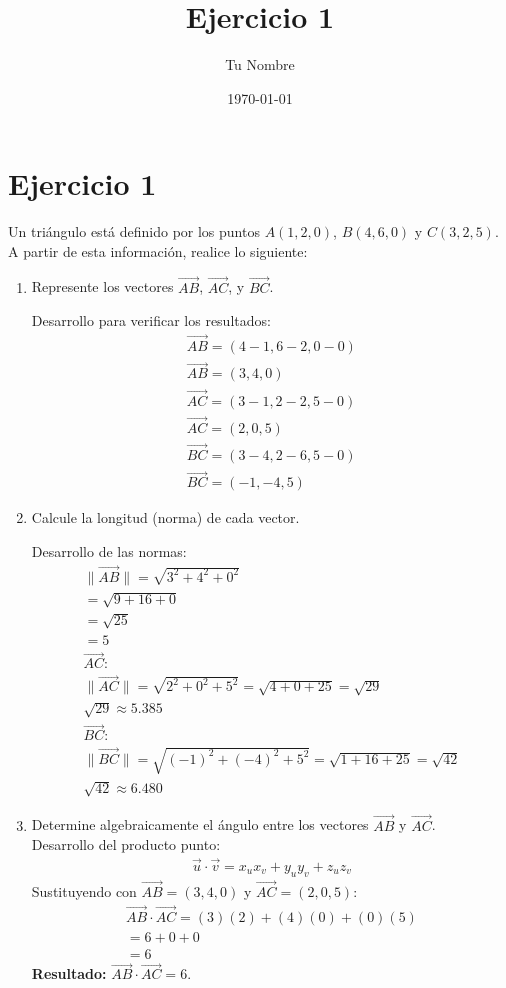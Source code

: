 \documentclass{article}
\title{Ejercicio 1}
\author{Tu Nombre}
\date{\today}
\begin{document}
\maketitle

\section*{Ejercicio 1}
Un triángulo está definido por los puntos $A(1,2,0)$, $B(4,6,0)$ y $C(3,2,5)$. A partir de esta información, realice lo siguiente:

\begin{enumerate}
    \item Represente los vectores $\overrightarrow{AB}$, $\overrightarrow{AC}$, y $\overrightarrow{BC}$.

    Desarrollo para verificar los resultados:
    \begin{gather*}
        \overrightarrow{AB}= (4-1,  6-2, 0-0) \\
        \overrightarrow{AB}=(3, 4, 0) \\
        \overrightarrow{AC}= (3-1,  2-2,  5-0) \\
        \overrightarrow{AC}=(2, 0,5) \\
        \overrightarrow{BC}= (3-4,2-6,5-0) \\
        \overrightarrow{BC}=(-1, -4,5)
    \end{gather*}
    \item Calcule la longitud (norma) de cada vector.

    Desarrollo de las normas:
    \begin{gather*}
        \|\vec{AB}\| = \sqrt{3^2 + 4^2 + 0^2} \\
        = \sqrt{9 + 16 + 0} \\
        = \sqrt{25} \\
        = 5 \\
        \vec{AC}: \\
        \|\vec{AC}\| = \sqrt{2^2 + 0^2 + 5^2} = \sqrt{4 + 0 + 25} = \sqrt{29} \\
        \sqrt{29} \approx 5.385 \\
        \vec{BC}: \\
        \|\vec{BC}\| = \sqrt{(-1)^2 + (-4)^2 + 5^2} = \sqrt{1 + 16 + 25} = \sqrt{42} \\
        \sqrt{42} \approx 6.480
    \end{gather*}
    \item Determine algebraicamente el ángulo entre los vectores $\overrightarrow{AB}$ y $\overrightarrow{AC}$.\\
    Desarrollo del producto punto:
    \begin{gather*}
        \vec{u}\cdot\vec{v} = x_u x_v + y_u y_v + z_u z_v
    \end{gather*}
    Sustituyendo con $\vec{AB}=(3,4,0)$ y $\vec{AC}=(2,0,5)$:
    \begin{gather*}
        \vec{AB}\cdot\vec{AC} = (3)(2) + (4)(0) + (0)(5) \\
        = 6 + 0 + 0 \\
        = 6
    \end{gather*}
    \noindent\textbf{Resultado:} $\vec{AB}\cdot\vec{AC} = 6$.


\end{enumerate}
\end{document}
